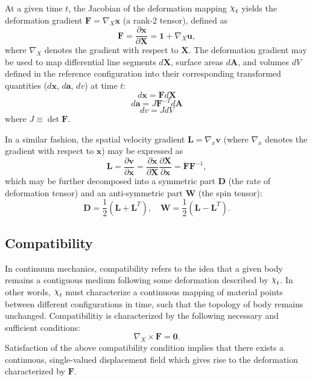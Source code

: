 At a given time $t$, the Jacobian of the deformation mapping $\raisebox{\depth}{$\chi$}_t$ yields the deformation gradient $\mathbf{F} = \nabla_X \mathbf{x}$ (a rank-2 tensor), defined as
\begin{equation}
  \mathbf{F} = \frac{\partial \mathbf{x}}{\partial \mathbf{X}} = \mathbf{1} + \nabla_X \mathbf{u},
\end{equation}
where $\nabla_X$ denotes the gradient with respect to $\mathbf{X}$. The deformation gradient may be used to map differential line segments $d \mathbf{X}$, surface areas $d \mathbf{A}$, and volumes $d V$ defined in the reference configuration into their corresponding transformed quantities ($d \mathbf{x}$, $d \mathbf{a}$, $dv$) at time $t$:
\begin{equation}
  d \mathbf{x} = \mathbf{F} d \mathbf{X}
\end{equation}
\begin{equation}
  d \mathbf{a} = J \mathbf{F}^{-T} d \mathbf{A}
\end{equation}
\begin{equation}
  d v = J d V
\end{equation}
where $J \equiv \det{\mathbf{F}}$.

In a similar fashion, the spatial velocity gradient $\mathbf{L} = \nabla_x \mathbf{v}$ (where $\nabla_x$ denotes the gradient with respect to $\mathbf{x}$) may be expressed as
\begin{equation}
  \mathbf{L} = \frac{\partial \mathbf{v}}{\partial \mathbf{x}} = \frac{\partial \dot{\mathbf{x}}}{\partial \mathbf{X}} \frac{\partial \mathbf{X}}{\partial \mathbf{x}} = \dot{\mathbf{F}} \mathbf{F}^{-1},
\end{equation}
which may be further decomposed into a symmetric part $\mathbf{D}$ (the rate of deformation tensor) and an anti-symmetric part $\mathbf{W}$ (the spin tensor):
\begin{equation}
  \mathbf{D} = \frac{1}{2} (\mathbf{L} + \mathbf{L}^T), \quad \mathbf{W} = \frac{1}{2} (\mathbf{L} - \mathbf{L}^T).
\end{equation}

\subsection{Compatibility}

In continuum mechanics, compatibility refers to the idea that a given body remains a contiguous medium following some deformation described by $\raisebox{\depth}{$\chi$}_t$. In other words, $\raisebox{\depth}{$\chi$}_t$ must characterize a continuous mapping of material points between different configurations in time, such that the topology of body remains unchanged. Compatibilitiy is characterized by the following necessary and sufficient conditions:
\begin{equation}
  \nabla_X \times \mathbf{F} = \mathbf{0}.
\end{equation}
Satisfaction of the above compatibility condition implies that there exists a continuous, single-valued displacement field which gives rise to the deformation characterized by $\mathbf{F}$.

